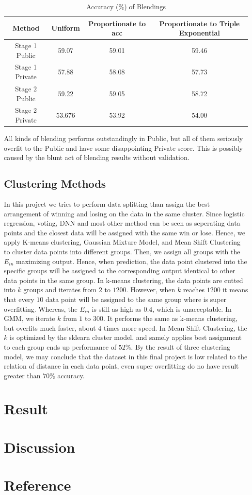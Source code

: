 \documentclass[10pt,a4paper]{article}
\begin{document}
\begin{table}[H]
  \centering
  \begin{tabular}{|c|c|c|c|}
  \hline
  Method & Uniform & Proportionate to acc & Proportionate to Triple Exponential \\ \hline
  Stage 1 Public & 59.07 & 59.01 & 59.46 \\ \hline
  Stage 1 Private & 57.88 & 58.08 & 57.73 \\ \hline
  Stage 2 Public & 59.22 & 59.05 & 58.72 \\ \hline
  Stage 2 Private & 53.676 & 53.92 & 54.00 \\ \hline
  \end{tabular}
  \caption{Accuracy (\%) of Blendings}
  \label{tab:blending-acc}
\end{table}

All kinds of blending performs outstandingly in Public, but all of them seriously overfit to the Public and have some disappointing Private score. 
This is possibly caused by the blunt act of blending results without validation.

\subsection{Clustering Methods}
In this project we tries to perform data splitting than assign the best arrangement of winning and losing on the data in the same cluster.
Since logistic regression, voting, DNN and most other method can be seen as seperating data points and the closest data will be assigned with the same win or lose.
Hence, we apply K-means clustering, Gaussian Mixture Model, and Mean Shift Clustering to cluster data points into different groups.
Then, we assign all groups with the $E_{in}$ maximizing output.
Hence, when prediction, the data point clustered into the specific groups will be assigned to the corresponding output identical to other data points in the same group.
In k-means clustering, the data points are cutted into $k$ groups and iterates from $2$ to $1200$.
However, when $k$ reaches $1200$ it means that every $10$ data point will be assigned to the same group where is super overfitting.
Whereas, the $E_{in}$ is still as high as $0.4$, which is unacceptable.
In GMM, we iterate $k$ from $1$ to $300$.
It performs the same as k-means clustering, but overfits much faster, about 4 times more speed.
In Mean Shift Clustering, the $k$ is optimized by the sklearn cluster model, and samely applies best assignment to each group ends up performance of $52\%$.
By the result of three clustering model, we may conclude that the dataset in this final project is low related to the relation of distance in each data point, even super overfitting do no have result greater than $70\%$ accuracy.


\section{Result}

\section{Discussion}

\section{Reference}
\end{document}
